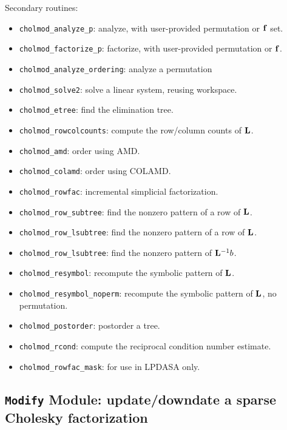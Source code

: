 \documentclass[11pt]{article}
\newcommand{\m}[1]{{\bf{#1}}}       %
\begin{document}
\noindent Secondary routines:
    \begin{itemize}
    \item {\tt cholmod\_analyze\_p}: analyze, with user-provided permutation or $\m{f}$ set.
    \item {\tt cholmod\_factorize\_p}: factorize, with user-provided permutation or $\m{f}$.
    \item {\tt cholmod\_analyze\_ordering}:  analyze a permutation
    \item {\tt cholmod\_solve2}: solve a linear system, reusing workspace.
    \item {\tt cholmod\_etree}: find the elimination tree.
    \item {\tt cholmod\_rowcolcounts}: compute the row/column counts of $\m{L}$.
    \item {\tt cholmod\_amd}: order using AMD.
    \item {\tt cholmod\_colamd}: order using COLAMD.
    \item {\tt cholmod\_rowfac}: incremental simplicial factorization.
    \item {\tt cholmod\_row\_subtree}: find the nonzero pattern of a row of $\m{L}$.
    \item {\tt cholmod\_row\_lsubtree}: find the nonzero pattern of a row of $\m{L}$.
    \item {\tt cholmod\_row\_lsubtree}: find the nonzero pattern of $\m{L}^{-1}b$.
    \item {\tt cholmod\_resymbol}: recompute the symbolic pattern of $\m{L}$.
    \item {\tt cholmod\_resymbol\_noperm}: recompute the symbolic pattern of $\m{L}$, no permutation.
    \item {\tt cholmod\_postorder}: postorder a tree.
    \item {\tt cholmod\_rcond}: compute the reciprocal condition number estimate.
    \item {\tt cholmod\_rowfac\_mask}: for use in LPDASA only.
    \end{itemize}

\newpage \subsection{{\tt Modify} Module: update/downdate a sparse Cholesky factorization}
\end{document}
